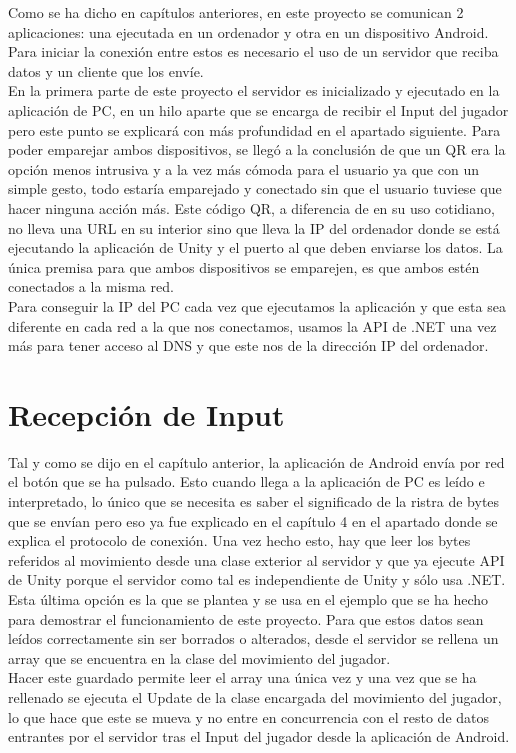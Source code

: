 Como se ha dicho en cap\'itulos anteriores, en este proyecto se comunican 2 aplicaciones: una ejecutada en un ordenador y otra en un dispositivo Android. Para iniciar la conexi\'on entre estos es necesario el uso de un servidor que reciba datos y un cliente que los env\'ie.
\\
 En la primera parte de este proyecto el servidor es inicializado y ejecutado en la aplicaci\'on de PC, en un hilo aparte que se encarga de recibir el Input del jugador pero este punto se explicar\'a con m\'as profundidad en el apartado siguiente. Para poder emparejar ambos dispositivos, se lleg\'o a la conclusi\'on de que un QR era la opci\'on menos intrusiva y a la vez m\'as c\'omoda para el usuario ya que con un simple gesto, todo estar\'ia emparejado y conectado sin que el usuario tuviese que hacer ninguna acci\'on m\'as. Este c\'odigo QR, a diferencia de en su uso cotidiano, no lleva una URL en su interior sino que lleva la IP del ordenador donde se est\'a ejecutando la aplicaci\'on de Unity y el puerto al que deben enviarse los datos. La \'unica premisa para que ambos dispositivos se emparejen, es que ambos est\'en conectados a la misma red. 
\\
Para conseguir la IP del PC cada vez que ejecutamos la aplicaci\'on y que esta sea diferente en cada red a la que nos conectamos, usamos la API de .NET una vez m\'as para tener acceso al DNS y que este nos de la direcci\'on IP del ordenador. 

\section{Recepci\'on de Input}
\label{cap6:sec:input}

Tal y como se dijo en el cap\'itulo anterior, la aplicaci\'on de Android env\'ia por red el bot\'on que se ha pulsado. Esto cuando llega a la aplicaci\'on de PC es le\'ido e interpretado, lo \'unico que se necesita es saber el significado de la ristra de bytes que se env\'ian pero eso ya fue explicado en el cap\'itulo 4 en el apartado donde se explica el protocolo de conexi\'on. Una vez hecho esto, hay que leer los bytes referidos al movimiento desde una clase exterior al servidor y que ya ejecute API de Unity porque el servidor como tal es independiente de Unity y s\'olo usa .NET.
\\
 Esta \'ultima opci\'on es la que se plantea y se usa en el ejemplo que se ha hecho para demostrar el funcionamiento de este proyecto.
Para que estos datos sean le\'idos correctamente sin ser borrados o alterados, desde el servidor se rellena un array que se encuentra en la clase del movimiento del jugador.
\\
 Hacer este guardado permite leer el array una \'unica vez y una vez que se ha rellenado se ejecuta el Update de la clase encargada del movimiento del jugador, lo que hace que este se mueva y no entre en concurrencia con el resto de datos entrantes por el servidor tras el Input del jugador desde la aplicaci\'on de Android.
